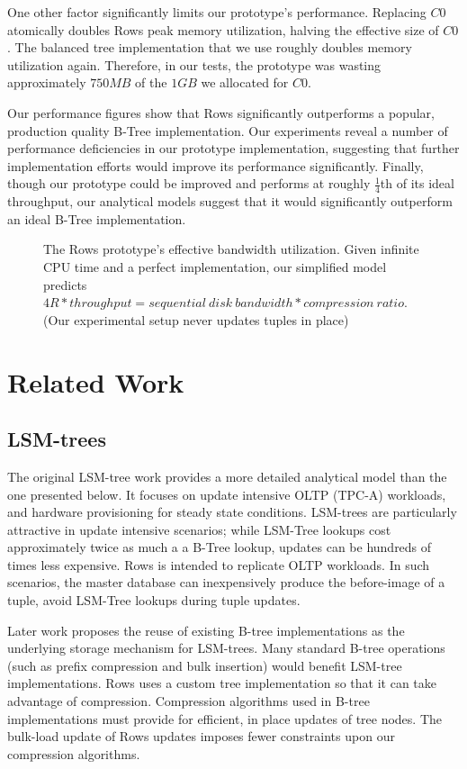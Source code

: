 \documentclass{sig-alternate-sigmod08}
\newcommand{\rows}{Rows\xspace}
\begin{document}
One other factor significantly limits our prototype's performance.
Replacing $C0$ atomically doubles \rows peak memory utilization,
halving the effective size of $C0$.  The balanced tree implementation
that we use roughly doubles memory utilization again.  Therefore, in
our tests, the prototype was wasting approximately $750MB$ of the
$1GB$ we allocated for $C0$.

Our performance figures show that \rows significantly outperforms a
popular, production quality B-Tree implementation.  Our experiments
reveal a number of performance deficiencies in our prototype
implementation, suggesting that further implementation efforts would
improve its performance significantly.  Finally, though our prototype
could be improved and performs at roughly $\frac{1}{4}$th of its ideal
throughput, our analytical models suggest that it would significantly
outperform an ideal B-Tree implementation.


\begin{figure}
\centering
{}
\caption{The \rows prototype's effective bandwidth utilization.  Given
  infinite CPU time and a perfect implementation, our simplified model predicts $4R * throughput = sequential~disk~bandwidth *
  compression~ratio$.  (Our experimental setup never updates tuples in
  place)}
\label{fig:4R}
\end{figure}

\section{Related Work}

\subsection{LSM-trees}

The original LSM-tree work\cite{lsm} provides a more detailed
analytical model than the one presented below.  It focuses on update
intensive OLTP (TPC-A) workloads, and hardware provisioning for steady
state conditions.  LSM-trees are particularly attractive in update
intensive scenarios; while LSM-Tree lookups cost approximately twice
as much a a B-Tree lookup, updates can be hundreds of times less
expensive.  \rows is intended to replicate OLTP workloads.  In such
scenarios, the master database can inexpensively produce the
before-image of a tuple, avoid LSM-Tree lookups during tuple updates.

Later work proposes the reuse of existing B-tree implementations as
the underlying storage mechanism for LSM-trees\cite{cidrPartitionedBTree}.  Many
standard B-tree operations (such as prefix compression and bulk insertion)
would benefit LSM-tree implementations.  \rows uses a custom tree
implementation so that it can take advantage of compression.
Compression algorithms used in B-tree implementations must provide for
efficient, in place updates of tree nodes.  The bulk-load update of
\rows updates imposes fewer constraints upon our compression
algorithms.
\end{document}
